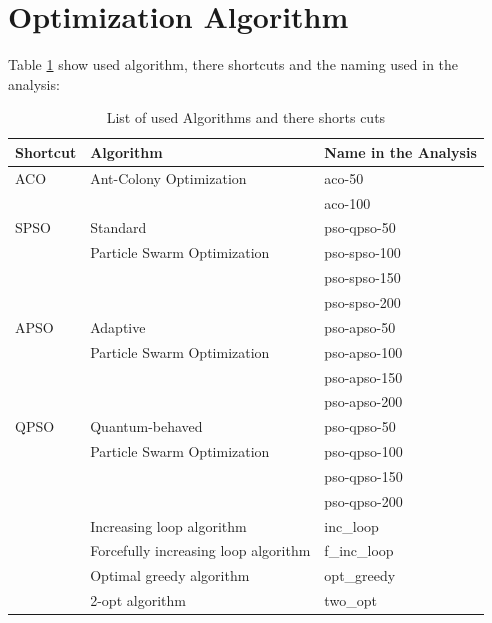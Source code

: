 \documentclass[conference]{IEEEtran}
\begin{document}
	\section{Optimization Algorithm}
	Table \ref{tab:classification} show used algorithm, there shortcuts and the naming used in the analysis:
		\begin{table}[h]
	    \centering
	    \begin{tabular}{ | l | l | l | }
	         \hline
        	Shortcut & Algorithm & Name in the Analysis \\ \hline \hline
        	ACO & Ant-Colony Optimization & aco-50\\
        	    &                         & aco-100\\ \hline
        	SPSO & Standard & pso-qpso-50\\
                &  Particle Swarm Optimization & pso-spso-100\\
                &                         & pso-spso-150\\
                &                         & pso-spso-200\\ \hline
        	APSO & Adaptive & pso-apso-50\\
                &  Particle Swarm Optimization & pso-apso-100\\
                &                         & pso-apso-150\\
                &                         & pso-apso-200\\ \hline
            QPSO & Quantum-behaved & pso-qpso-50\\
                &  Particle Swarm Optimization & pso-qpso-100\\
                &                         & pso-qpso-150\\
                &                         & pso-qpso-200\\ \hline
                & Increasing loop algorithm & inc\_loop \\ \hline
                & Forcefully increasing loop algorithm & f\_inc\_loop \\ \hline
                & Optimal greedy algorithm & opt\_greedy \\ \hline
                & 2-opt algorithm & two\_opt \\ \hline
	    \end{tabular}
	    \caption{List of used Algorithms and there shorts cuts}
	    \label{tab:classification}
	\end{table}
	
\end{document}
